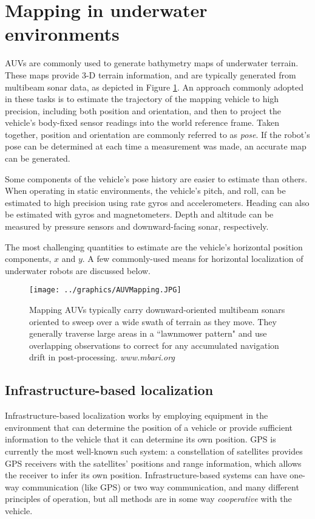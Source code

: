 \section{Mapping in underwater environments}

AUVs are commonly used to generate bathymetry maps of underwater terrain. These maps provide 3-D terrain information, and are typically generated from multibeam sonar data, as depicted in Figure \ref{fig:AUVbathyMapping}. An approach commonly adopted in these tasks is to estimate the trajectory of the mapping vehicle to high precision, including both position and orientation, and then to project the vehicle's body-fixed sensor readings into the world reference frame. Taken together, position and orientation are commonly referred to as \emph{pose}. If the robot's pose can be determined at each time a measurement was made, an accurate map can be generated. 

Some components of the vehicle's pose history are easier to estimate than others. When operating in static environments, the vehicle's pitch, and roll, can be estimated to high precision using rate gyros and accelerometers. Heading can also be estimated with gyros and magnetometers. Depth and altitude can be measured by pressure sensors and downward-facing sonar, respectively. 

The most challenging quantities to estimate are the vehicle's horizontal position components, $x$ and $y$. A few commonly-used means for horizontal localization of underwater robots are discussed below.

\begin{figure}[!htb]
   \centering
   \texttt{[image: ../graphics/AUVMapping.JPG]} %
   \caption{Mapping AUVs typically carry downward-oriented multibeam sonars oriented to sweep over a wide swath of terrain as they move. They generally traverse large areas in a ``lawnmower pattern" and use overlapping observations to correct for any accumulated navigation drift in post-processing. \emph{www.mbari.org} }
   \label{fig:AUVbathyMapping}
\end{figure}

\subsection{Infrastructure-based localization}

Infrastructure-based localization works by employing equipment in the environment that can determine the position of a vehicle or provide sufficient information to the vehicle that it can determine its own position. GPS is currently the most well-known such system: a constellation of satellites provides GPS receivers with the satellites' positions and range information, which allows the receiver to infer its own position. Infrastructure-based systems can have one-way communication (like GPS) or two way communication, and many different principles of operation, but all methods are in some way \emph{cooperative} with the vehicle. 

